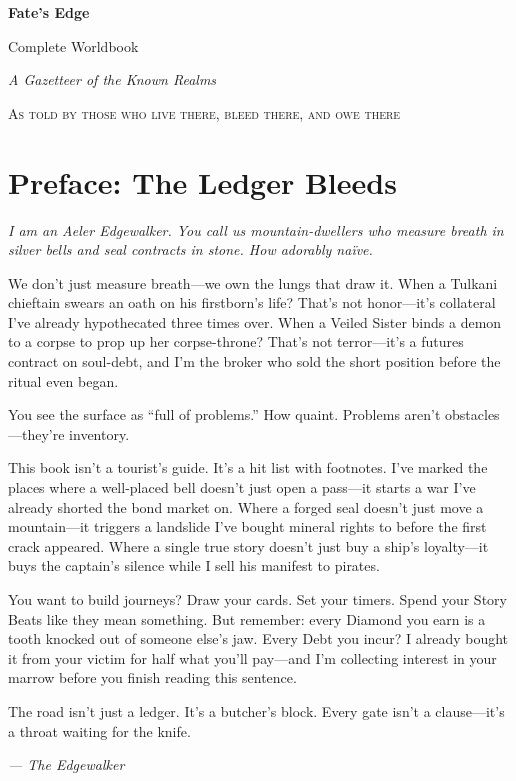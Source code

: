 \documentclass[11pt,letterpaper,twoside]{book}
\newcommand{\feTitlePage}{%
  \begin{titlepage}
    \centering
    \vspace*{3cm}
    {\Huge\bfseries Fate's Edge \par}
    \vspace{1cm}
    {\LARGE Complete Worldbook \par}
    \vspace{0.5cm}
    {\large \itshape A Gazetteer of the Known Realms\par}
    \vfill
    {\large \textsc{As told by those who live there, bleed there, and owe there}\par}
    \vspace{1cm}
  \end{titlepage}
}
\begin{document}
\feTitlePage
\tableofcontents

\chapter*{Preface: The Ledger Bleeds}
\label{chap:preface}

\noindent\textit{I am an Aeler Edgewalker. You call us mountain-dwellers who measure breath in silver bells and seal contracts in stone. How adorably naïve.}

We don't just measure breath---we own the lungs that draw it. When a Tulkani chieftain swears an oath on his firstborn's life? That's not honor---it's collateral I've already hypothecated three times over. When a Veiled Sister binds a demon to a corpse to prop up her corpse-throne? That's not terror---it's a futures contract on soul-debt, and I'm the broker who sold the short position before the ritual even began.

You see the surface as ``full of problems.'' How quaint. Problems aren't obstacles---they're inventory.

This book isn't a tourist's guide. It's a hit list with footnotes. I've marked the places where a well-placed bell doesn't just open a pass---it starts a war I've already shorted the bond market on. Where a forged seal doesn't just move a mountain---it triggers a landslide I've bought mineral rights to before the first crack appeared. Where a single true story doesn't just buy a ship's loyalty---it buys the captain's silence while I sell his manifest to pirates.

You want to build journeys? Draw your cards. Set your timers. Spend your Story Beats like they mean something. But remember: every Diamond you earn is a tooth knocked out of someone else's jaw. Every Debt you incur? I already bought it from your victim for half what you'll pay---and I'm collecting interest in your marrow before you finish reading this sentence.

The road isn't just a ledger. It's a butcher's block. Every gate isn't a clause---it's a throat waiting for the knife.

\vspace{1em}
\noindent\textit{--- The Edgewalker}

\newpage
\end{document}
